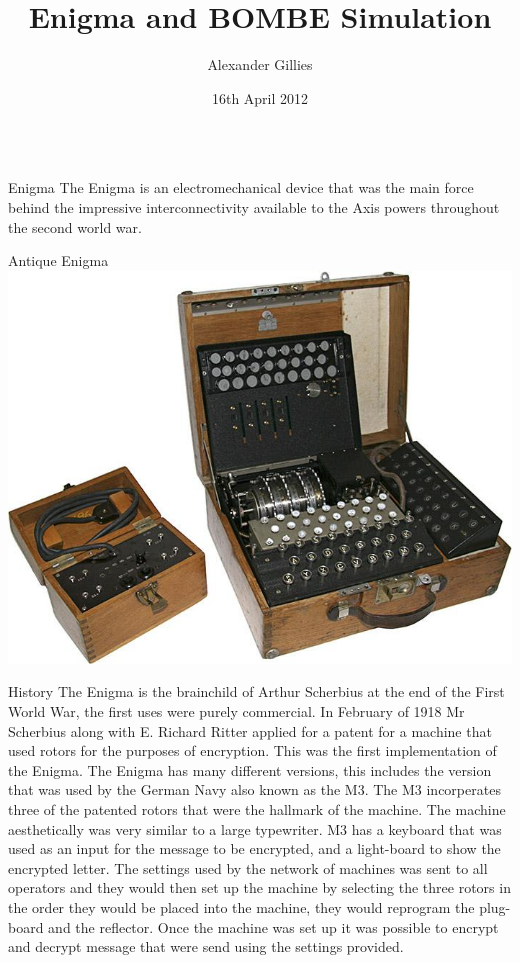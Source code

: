 \documentclass[final]{beamer}
\title[Final Year Project Poster]{Enigma and BOMBE Simulation}
\author[A L Gillies]{Alexander Gillies}
\institute[Durham]{School of Engineering and Computing Sciences, Durham University}
\date{16th April 2012}
\begin{document}
  \begin{frame}{} 

  \vfill
    \begin{columns}[t]
    
    
      \begin{column}{.32\linewidth}
      \centering
        \begin{block}{Enigma}
          The Enigma is an electromechanical device that was the main force behind the impressive interconnectivity available to the Axis powers throughout the second world war.
        \end{block}
        
         \begin{block}{Antique Enigma}
          \includegraphics[width=.5\columnwidth]{historicEnigma.png} 
        \end{block}
        
         \begin{block}{History} \small{
          The Enigma is the brainchild of  Arthur Scherbius at the end of the First World War, the first uses were purely commercial. In February of 1918 Mr Scherbius along with E. Richard Ritter applied for a patent for a machine that used rotors for the purposes of encryption. This was the first implementation of the Enigma. The Enigma has many different versions, this includes the version that was used by the German Navy also known as the M3. The M3 incorperates three of the patented rotors that were the hallmark of the machine. The machine aesthetically was very similar to a large typewriter. M3 has a keyboard that was used as an input for the message to be encrypted, and a light-board to show the encrypted letter. The settings used by the network of machines was sent to all operators and they would then set up the machine by selecting the three rotors in the order they would be placed into the machine, they would reprogram the plug-board and the reflector. Once the machine was set up it was possible to encrypt and decrypt message that were send using the settings provided.}
        \end{block}
        

\end{column}
\end{columns}
\end{frame}
\end{document}

